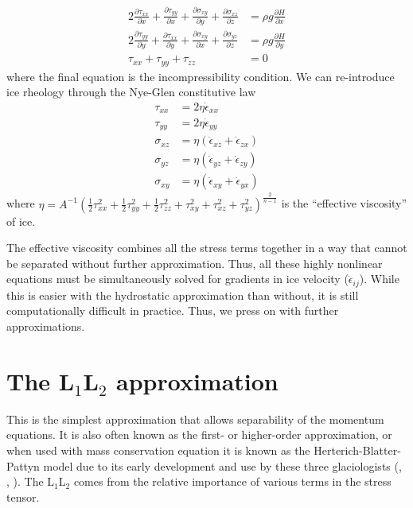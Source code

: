 \documentclass[12pt]{article}
\theoremstyle{definition}
\newcommand{\pd}[2]{\frac{\partial {#1}}{\partial {#2}}}
\begin{document}
\begin{shaded}
\begin{align}
2 \pd{\tau_{xx}}{x} + \pd{\tau_{yy}}{x} + \pd{\sigma_{xy}}{y} + \pd{\sigma_{xz}}{z} &= \rho g \pd{H}{x} \\
2 \pd{\tau_{yy}}{y} + \pd{\tau_{xx}}{y} + \pd{\sigma_{xy}}{x} + \pd{\sigma_{yz}}{z} &= \rho g \pd{H}{y} \\
\tau_{xx} + \tau_{yy} + \tau_{zz} &= 0
\end{align}
where the final equation is the incompressibility condition. We can re-introduce ice rheology through the Nye-Glen constitutive law
\begin{align}
\tau_{xx} &= 2 \eta \dot{\epsilon}_{xx} \\ 
\tau_{yy} &= 2 \eta \dot{\epsilon}_{yy} \\
\sigma_{xz} &= \eta \left(\dot{\epsilon}_{xz} + \dot{\epsilon}_{zx} \right) \\
\sigma_{yz} &= \eta \left(\dot{\epsilon}_{yz} + \dot{\epsilon}_{zy} \right) \\
\sigma_{xy} &= \eta \left(\dot{\epsilon}_{xy} + \dot{\epsilon}_{yx} \right)
\end{align}
where $\eta = A^{-1} \left(\frac{1}{2} \tau_{xx}^2 + \frac{1}{2} \tau_{yy}^2 + \frac{1}{2} \tau_{zz}^2 + \tau_{xy}^2 + \tau_{xz}^2 + \tau_{yz}^2 \right)^{\frac{2}{n-1}}$ is the ``effective viscosity'' of ice.
\end{shaded}

The effective viscosity combines all the stress terms together in a way that cannot be separated without further approximation. Thus, all these highly nonlinear equations must be simultaneously solved for gradients in ice velocity ($\dot{\epsilon}_{ij}$). While this is easier with the hydrostatic approximation than without, it is still computationally difficult in practice. Thus, we press on with further approximations.

\section{The L$_1$L$_2$ approximation}
This is the simplest approximation that allows separability of the momentum equations. It is also often known as the first- or higher-order approximation, or when used with mass conservation equation it is known as the Herterich-Blatter-Pattyn model due to its early development and use by these three glaciologists (\cite{Herterich1987}, \cite{Blatter1995}, \cite{Pattyn2002}). The L$_1$L$_2$ comes from the relative importance of various terms in the stress tensor.
\end{document}

